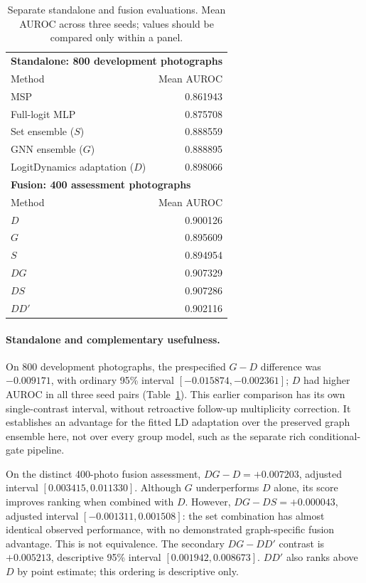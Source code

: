 \begin{table}[htbp]
\centering
\caption{Separate standalone and fusion evaluations. Mean AUROC across
three seeds; values should be compared only within a panel.}
\label{tab:standalone-fusion}
\begin{tabular}{lr}
\hline
\multicolumn{2}{l}{\textbf{Standalone: 800 development photographs}}\\
Method & Mean AUROC\\
\hline
MSP & 0.861943\\
Full-logit MLP & 0.875708\\
Set ensemble ($S$) & 0.888559\\
GNN ensemble ($G$) & 0.888895\\
LogitDynamics adaptation ($D$) & 0.898066\\
\hline
\multicolumn{2}{l}{\textbf{Fusion: 400 assessment photographs}}\\
Method & Mean AUROC\\
\hline
$D$ & 0.900126\\
$G$ & 0.895609\\
$S$ & 0.894954\\
$DG$ & 0.907329\\
$DS$ & 0.907286\\
$DD'$ & 0.902116\\
\hline
\end{tabular}
\end{table}

\paragraph{Standalone and complementary usefulness.}
On 800 development photographs, the prespecified $G-D$ difference was
$-0.009171$, with ordinary 95\% interval $[-0.015874,-0.002361]$;
$D$ had higher AUROC in all three seed pairs
(Table~\ref{tab:standalone-fusion}). This earlier comparison has its own
single-contrast interval, without retroactive follow-up multiplicity
correction. It establishes an advantage for the fitted LD adaptation over
the preserved graph ensemble here, not over every group model, such as
the separate rich conditional-gate pipeline.

On the distinct 400-photo fusion assessment, $DG-D=+0.007203$, adjusted
interval $[0.003415,0.011330]$. Although $G$ underperforms $D$ alone,
its score improves ranking when combined with $D$. However,
$DG-DS=+0.000043$, adjusted interval $[-0.001311,0.001508]$:
the set combination has almost identical observed performance, with no
demonstrated graph-specific fusion advantage. This is not equivalence.
The secondary $DG-DD'$ contrast is $+0.005213$, descriptive 95\%
interval $[0.001942,0.008673]$. $DD'$ also ranks above $D$ by point
estimate; this ordering is descriptive only.


